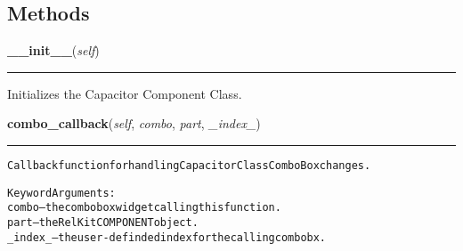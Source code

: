   \subsection{Methods}

    \label{reliafree:capacitors:capacitor:Capacitor:__init__}

    \vspace{0.5ex}

\hspace{.8\funcindent}\begin{boxedminipage}{\funcwidth}

    \raggedright \textbf{\_\_init\_\_}(\textit{self})

    \vspace{-1.5ex}

    \rule{\textwidth}{0.5\fboxrule}
\setlength{\parskip}{2ex}
    Initializes the Capacitor Component Class.

\setlength{\parskip}{1ex}
    \end{boxedminipage}

    \label{reliafree:capacitors:capacitor:Capacitor:combo_callback}

    \vspace{0.5ex}

\hspace{.8\funcindent}\begin{boxedminipage}{\funcwidth}

    \raggedright \textbf{combo\_callback}(\textit{self}, \textit{combo}, \textit{part}, \textit{\_index\_})

    \vspace{-1.5ex}

    \rule{\textwidth}{0.5\fboxrule}
\setlength{\parskip}{2ex}
\begin{alltt}
Callback function for handling Capacitor Class ComboBox changes.

Keyword Arguments:
  combo -- the combobox widget calling this function.
   part -- the RelKit COMPONENT object.
\_index\_ -- the user-definded index for the calling combobx.
\end{alltt}

\setlength{\parskip}{1ex}
    \end{boxedminipage}

